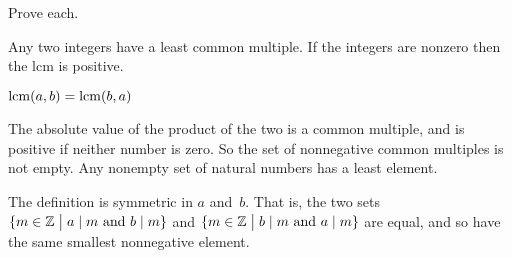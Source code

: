 \documentclass{ibl}  %
\begin{document}
\begin{ex} Prove each.
\begin{items}
\item {} Any two integers have a least common multiple.
  If the integers are nonzero then the lcm is positive.
\item {} $\operatorname{lcm}(a,b)=\operatorname{lcm}(b,a)$
\end{items}
\begin{ans}
\begin{items}
\item The absolute value of the product of the two is a common multiple,
  and is positive if neither number is zero.
  So the set of nonnegative common multiples is not empty.
  Any nonempty set of natural numbers has a least element.
\item The definition is symmetric in $a$ and~$b$.
  That is, the two sets
  $\{m\in\mathbb{Z} \bigm| \text{$a\mid m$ and $b\mid m$}\}$
  and     
  $\{m\in\mathbb{Z} \bigm| \text{$b\mid m$ and $a\mid m$}\}$
  are equal, and so have the same smallest nonnegative element.
\end{items}
\end{ans}
\end{ex}
\end{document}
